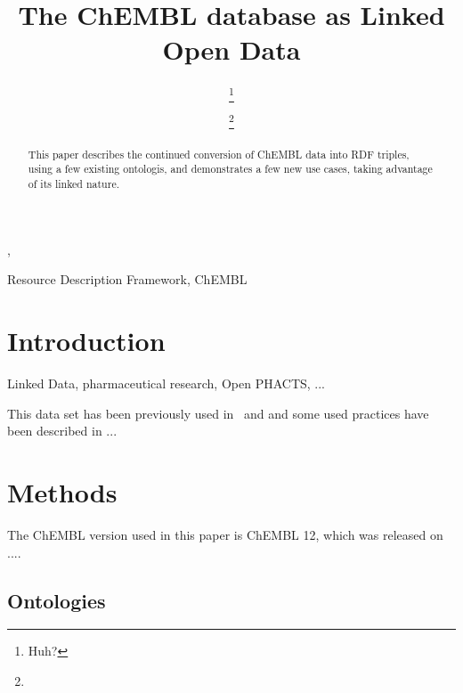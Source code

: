 \documentclass[sw]{iosart2c}
\begin{document}
\begin{frontmatter}

\title{The ChEMBL database as Linked Open Data}



\author[A]{ \thanks{Huh?}}
\address[A]{Maastricht University}

\author[A]{ \thanks{}},

\begin{abstract}
This paper describes the continued conversion of ChEMBL data into RDF triples, using a few existing
ontologis, and demonstrates a few new use cases, taking advantage of its linked nature.
\end{abstract}

\begin{keyword}
Resource Description Framework, ChEMBL
\end{keyword}

\end{frontmatter}


\section{Introduction}\label{s1}

Linked Data, pharmaceutical research, Open PHACTS, ...

This data set has been previously used in~\cite{} and \cite{} and some used practices have
been described in \cite{}...


\section{Methods}\label{s2}

The ChEMBL version used in this paper is ChEMBL 12, which was released on ....

\subsection{Ontologies}
\end{document}
